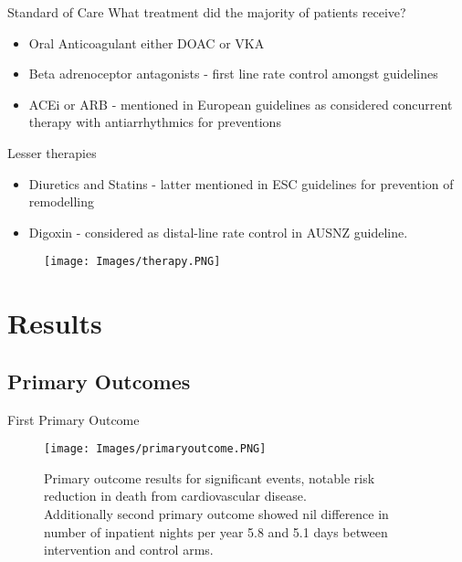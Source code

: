 \documentclass[UKenglish]{beamer}
\begin{document}
\begin{frame}[allowframebreaks]{Standard of Care}
    What treatment did the majority of patients receive?
    
    \begin{itemize}
        \item Oral Anticoagulant either DOAC or VKA
        \item Beta adrenoceptor antagonists - first line rate control amongst guidelines
        \item ACEi or ARB - mentioned in European guidelines as considered concurrent therapy with antiarrhythmics for preventions
    \end{itemize}
    
    Lesser therapies
    
    \begin{itemize}
        \item Diuretics and Statins - latter mentioned in ESC guidelines for prevention of remodelling
        \item Digoxin - considered as distal-line rate control in AUSNZ guideline.
    \end{itemize}
    \begin{figure}
        \texttt{[image: Images/therapy.PNG]}
    
    \end{figure}
    
\end{frame}

\section{Results}
\subsection{Primary Outcomes}

\begin{frame}{First Primary Outcome}
    \begin{figure}
        \texttt{[image: Images/primaryoutcome.PNG]}
        \caption{Primary outcome results for significant events, notable risk reduction in death from cardiovascular disease.\\
        Additionally second primary outcome showed nil difference in number of inpatient nights per year 5.8 and 5.1 days between intervention and control arms.}
    \end{figure}
    
\end{frame}
\end{document}
